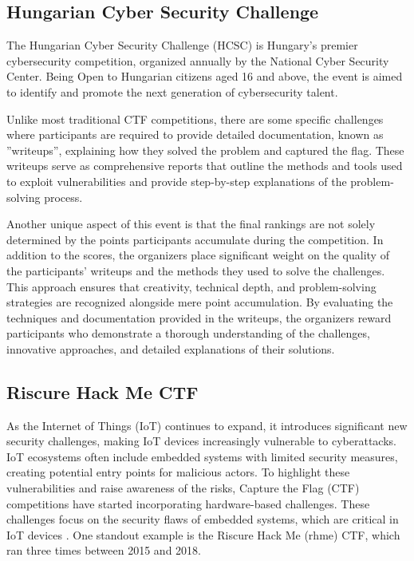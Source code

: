 \documentclass[conference]{IEEEtran}
\begin{document}
\subsection{Hungarian Cyber Security Challenge}

The Hungarian Cyber Security Challenge (HCSC) is Hungary’s premier
cybersecurity competition, organized annually by the National Cyber Security
Center. Being Open to Hungarian citizens aged 16 and above, the event is
aimed to identify and promote the next generation of
cybersecurity talent. 

Unlike most traditional CTF competitions, there are some specific challenges
where participants are required to provide detailed documentation, known as
''writeups'', explaining how they solved the problem and captured the flag. These
writeups serve as comprehensive reports that outline the methods and tools used
to exploit vulnerabilities and provide step-by-step explanations of the
problem-solving process.

Another unique aspect of this event is that the final rankings are not solely
determined by the points participants accumulate during the competition. In
addition to the scores, the organizers place significant weight on the quality
of the participants' writeups and the methods they used to solve the
challenges. This approach ensures that creativity, technical depth, and
problem-solving strategies are recognized alongside mere point accumulation.
By evaluating the techniques and documentation provided in the writeups, the
organizers reward participants who demonstrate a thorough understanding of the
challenges, innovative approaches, and detailed explanations of their
solutions.

\subsection{Riscure Hack Me CTF}

As the Internet of Things (IoT) continues to expand, it introduces significant
new security challenges, making IoT devices increasingly vulnerable to
cyberattacks. IoT ecosystems often include embedded systems with limited
security measures, creating potential entry points for malicious actors. To
highlight these vulnerabilities and raise awareness of the risks, Capture the
Flag (CTF) competitions have started incorporating hardware-based challenges.
These challenges focus on the security flaws of embedded systems, which are
critical in IoT devices \cite{prinetto2020}. %
One standout example is the Riscure Hack Me (rhme) CTF, which ran three times
between 2015 and 2018.
\end{document}
